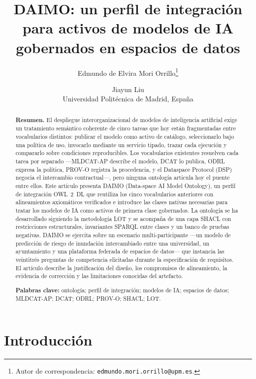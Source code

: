 \documentclass[11pt,a4paper]{article}
\title{DAIMO: un perfil de integración para activos de modelos de IA\\gobernados en espacios de datos}
\author{Edmundo de Elvira Mori Orrillo\thanks{Autor de correspondencia: \texttt{edmundo.mori.orrillo@upm.es}.} \and Jiayun Liu \\[0.5em]
\normalsize Universidad Politécnica de Madrid, España}
\date{}
\begin{document}
\maketitle

\begin{abstract}
\noindent\textbf{Resumen.}
El despliegue interorganizacional de modelos de inteligencia artificial exige un tratamiento semántico coherente de cinco tareas que hoy están fragmentadas entre vocabularios distintos: publicar el modelo como activo de catálogo, seleccionarlo bajo una política de uso, invocarlo mediante un servicio tipado, trazar cada ejecución y compararlo sobre condiciones reproducibles. Los vocabularios existentes resuelven cada tarea por separado ---MLDCAT-AP describe el modelo, DCAT lo publica, ODRL expresa la política, PROV-O registra la procedencia, y el Dataspace Protocol (DSP) negocia el intercambio contractual---, pero ninguna ontología articula hoy el puente entre ellos. Este artículo presenta DAIMO (Data-space AI Model Ontology), un perfil de integración OWL~2~DL que reutiliza los cinco vocabularios anteriores con alineamientos axiomáticos verificados e introduce las clases nativas necesarias para tratar los modelos de IA como activos de primera clase gobernados. La ontología se ha desarrollado siguiendo la metodología LOT y se acompaña de una capa SHACL con restricciones estructurales, invariantes SPARQL entre clases y un banco de pruebas negativas. DAIMO se ejercita sobre un escenario multi-participante ---un modelo de predicción de riesgo de inundación intercambiado entre una universidad, un ayuntamiento y una plataforma federada de espacios de datos--- que instancia las veintitrés preguntas de competencia elicitadas durante la especificación de requisitos. El artículo describe la justificación del diseño, los compromisos de alineamiento, la evidencia de corrección y las limitaciones conocidas del artefacto.

\medskip
\noindent\textbf{Palabras clave:} ontología; perfil de integración; modelos de IA; espacios de datos; MLDCAT-AP; DCAT; ODRL; PROV-O; SHACL; LOT.
\end{abstract}

\section{Introducción}\label{sec:intro}
\end{document}
